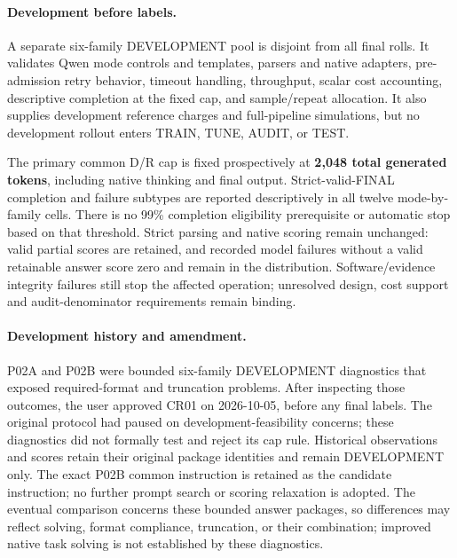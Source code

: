 \documentclass{article}
\newcommand{\1}{\mathbb{I}}
\begin{document}
\paragraph{Development before labels.}
A separate six-family DEVELOPMENT pool is disjoint from all final rolls. It validates Qwen mode controls and templates, parsers and native adapters, pre-admission retry behavior, timeout handling, throughput, scalar cost accounting, descriptive completion at the fixed cap, and sample/repeat allocation. It also supplies development reference charges and full-pipeline simulations, but no development rollout enters TRAIN, TUNE, AUDIT, or TEST.

The primary common D/R cap is fixed prospectively at \textbf{2,048 total generated tokens}, including native thinking and final output. Strict-valid-FINAL completion and failure subtypes are reported descriptively in all twelve mode-by-family cells. There is no 99\% completion eligibility prerequisite or automatic stop based on that threshold. Strict parsing and native scoring remain unchanged: valid partial scores are retained, and recorded model failures without a valid retainable answer score zero and remain in the distribution. Software/evidence integrity failures still stop the affected operation; unresolved design, cost support and audit-denominator requirements remain binding.

\paragraph{Development history and amendment.}
P02A and P02B were bounded six-family DEVELOPMENT diagnostics that exposed required-format and truncation problems. After inspecting those outcomes, the user approved CR01 on 2026-10-05, before any final labels. The original protocol had paused on development-feasibility concerns; these diagnostics did not formally test and reject its cap rule. Historical observations and scores retain their original package identities and remain DEVELOPMENT only. The exact P02B common instruction is retained as the candidate instruction; no further prompt search or scoring relaxation is adopted. The eventual comparison concerns these bounded answer packages, so differences may reflect solving, format compliance, truncation, or their combination; improved native task solving is not established by these diagnostics.
\end{document}
